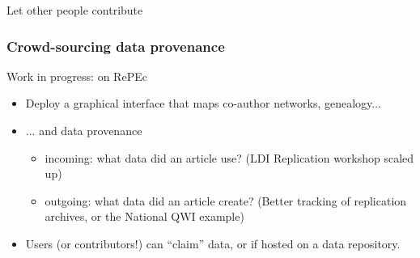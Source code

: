 \begin{frame}
\begin{block}{Let other people contribute}
	\end{block}
\end{frame}

\begin{frame}
	\frametitle{Crowd-sourcing data provenance}
	\begin{block}{Work in progress: on RePEc}
	\begin{itemize}
		\item Deploy a graphical interface that maps co-author networks, genealogy...
		\item ... and data provenance 
		\begin{itemize}
			\item incoming: what data did an article use? (LDI Replication workshop scaled up)
			\item outgoing: what data did an article create? (Better tracking of replication archives, or the National QWI example)
		\end{itemize}
		\item Users (or contributors!) can ``claim'' data, or if hosted on a data repository.
	\end{itemize}
	\end{block}
\end{frame}

